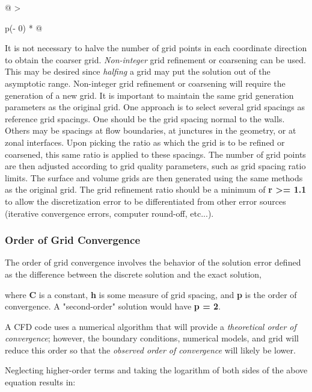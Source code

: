 \begin{longtable}[]{@{}
  >{\raggedright\arraybackslash}p{(\columnwidth - 0\tabcolsep) * }@{}}
\begin{minipage}[t]{\linewidth}
It is not necessary to halve the number of grid points in each
coordinate direction to obtain the coarser grid. \emph{Non-integer} grid
refinement or coarsening can be used. This may be desired since
\emph{halfing} a grid may put the solution out of the asymptotic range.
Non-integer grid refinement or coarsening will require the generation of
a new grid. It is important to maintain the same grid generation
parameters as the original grid. One approach is to select several grid
spacings as reference grid spacings. One should be the grid spacing
normal to the walls. Others may be spacings at flow boundaries, at
junctures in the geometry, or at zonal interfaces. Upon picking the
ratio as which the grid is to be refined or coarsened, this same ratio
is applied to these spacings. The number of grid points are then
adjusted according to grid quality parameters, such as grid spacing
ratio limits. The surface and volume grids are then generated using the
same methods as the original grid. The grid refinement ratio should be a
minimum of \textbf{r \textgreater= 1.1} to allow the discretization
error to be differentiated from other error sources (iterative
convergence errors, computer round-off, etc...).

\hypertarget{order-of-grid-convergence}{%
\subsubsection{Order of Grid
Convergence}\label{order-of-grid-convergence}}

The order of grid convergence involves the behavior of the solution
error defined as the difference between the discrete solution and the
exact solution,


where \textbf{C} is a constant, \textbf{h} is some measure of grid
spacing, and \textbf{p} is the order of convergence. A "second-order"
solution would have \textbf{p = 2}.

A CFD code uses a numerical algorithm that will provide a
\emph{theoretical order of convergence}; however, the boundary
conditions, numerical models, and grid will reduce this order so that
the \emph{observed order of convergence} will likely be lower.

Neglecting higher-order terms and taking the logarithm of both sides of
the above equation results in:



\end{minipage}
\end{longtable}
